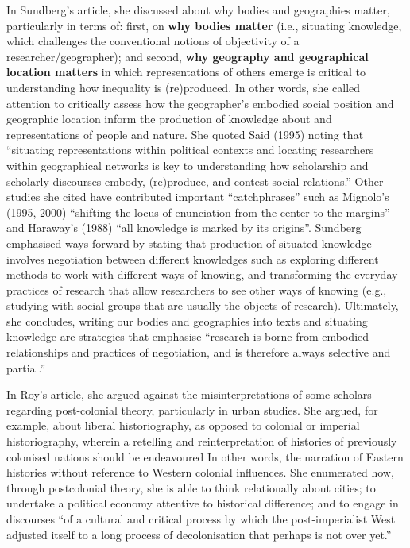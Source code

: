 \documentclass[a4paper, 10.5pt]{article} %
\begin{document}
In Sundberg's article, she discussed about why bodies and geographies matter, particularly in terms of: first, on \textbf{why bodies matter} (i.e., situating knowledge, which challenges the conventional notions of objectivity of a researcher/geographer); and second, \textbf{why geography and geographical location matters} in which representations of others emerge is critical to understanding how inequality is (re)produced. In other words, she called attention to critically assess how the geographer's embodied social position and geographic location inform the production of knowledge about and representations of people and nature. She quoted Said (1995) noting that \enquote{situating representations within political contexts and locating researchers within geographical networks is key to understanding how scholarship and scholarly discourses embody, (re)produce, and contest social relations.} Other studies she cited have contributed important \enquote{catchphrases} such as Mignolo's (1995, 2000) \enquote{shifting the locus of enunciation from the center to the margins} and Haraway's (1988) \enquote{all knowledge is marked by its origins}. Sundberg emphasised ways forward by stating that production of situated knowledge involves negotiation between different knowledges such as exploring different methods to work with different ways of knowing, and transforming the everyday practices of research that allow researchers to see other ways of knowing (e.g., studying with social groups that are usually the objects of research). Ultimately, she concludes, writing our bodies and geographies into texts and situating knowledge are strategies that emphasise \enquote{research is borne from embodied relationships and practices of negotiation, and is therefore always selective and partial.}

In Roy's article, she argued against the misinterpretations of some scholars regarding post-colonial theory, particularly in urban studies. She argued, for example, about liberal historiography, as opposed to colonial or imperial historiography, wherein a retelling and reinterpretation of histories of previously colonised nations should be endeavoured In other words, the narration of Eastern histories without reference to Western colonial influences. She enumerated how, through postcolonial theory, she is able to think relationally about cities; to undertake a political economy attentive to historical difference; and to engage in discourses \enquote{of a cultural and critical process by which the post-imperialist West adjusted itself to a long process of decolonisation that perhaps is not over yet.}
\end{document}
